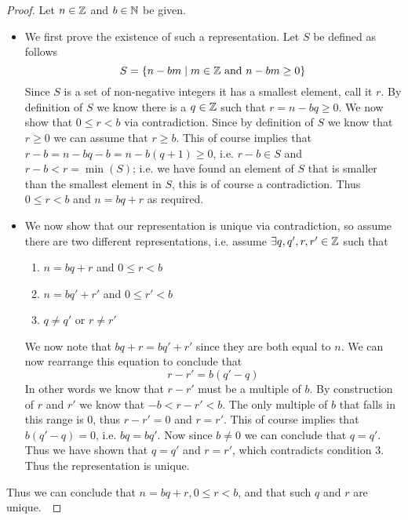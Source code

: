         \begin{proof}
            Let $n \in \mathbb{Z}$ and $b \in \mathbb{N}$ be given.
            \begin{itemize}
                \item
                    We first prove the existence of such a representation.
                    Let $S$ be defined as follows
                    \[
                        S = \left\{n - bm \mid m \in \mathbb{Z} \mbox{ and } n - bm \ge 0\right\}
                    \]
                    Since $S$ is a set of non-negative integers it has a smallest element,
                    call it $r$. By definition of $S$ we know there is a $q \in \mathbb{Z}$
                    such that $r = n - bq \ge 0$. We now show that $0 \le r < b$ via contradiction.
                    Since by definition of $S$ we know that $r \ge 0$ we can assume that
                    $r \ge b$. This of course implies that $r - b = n - bq - b = n - b(q + 1) \ge 0$,
                    i.e. $r - b \in S$ and $r - b < r = \min(S)$; i.e. we have found an element
                    of $S$ that is smaller than the smallest element in $S$, this is 
                    of course a contradiction. Thus $0 \le r < b$ and $n = bq + r$ as required.
                \item
                    We now show that our representation is unique via contradiction, so 
                    assume there are two different representations, i.e. assume $\exists
                    q, q', r, r' \in \mathbb{Z}$ such that
                    \begin{enumerate}
                        \item
                            $n = bq + r$ and $0 \le r < b$
                        \item
                            $n = bq' + r'$ and $0 \le r' < b$
                        \item
                            $q \neq q'$ or $r \neq r'$
                    \end{enumerate}
                    We now note that $bq + r = bq' + r'$ since they are both equal to $n$. We
                    can now rearrange this equation to conclude that
                    \[
                        r - r' = b(q' - q)
                    \]
                    In other words we know that $r - r'$ must be a multiple of $b$. By construction
                    of $r$ and $r'$ we know that $-b < r - r' < b$. The only multiple of $b$ that falls in
                    this range is 0, thus $r - r' = 0$ and $r = r'$. This of course implies
                    that $b(q' - q) = 0$, i.e. $bq = bq'$. Now since $b \neq 0$ we can conclude that $q = q'$.
                    Thus we have shown that $q = q'$ and $r = r'$, which contradicts condition 3.
                    Thus the representation is unique.
            \end{itemize}
            Thus we can conclude that $n = bq + r, 0 \le r < b$, and 
            that such $q$ and $r$ are unique.~\QED
        \end{proof}
